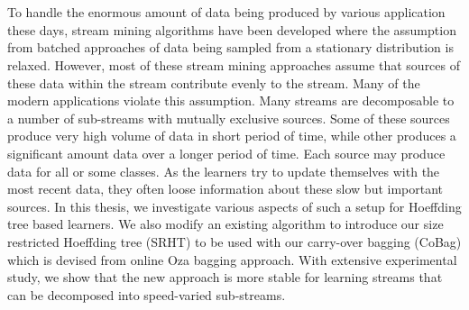 \chapter{\abstractname}
To handle the enormous amount of data being produced by various application these days, stream mining algorithms have been developed where the assumption from batched approaches of data being sampled from a stationary distribution is relaxed.
However, most of these stream mining approaches assume that sources of these data within the stream contribute evenly to the stream.
Many of the modern applications violate this assumption. Many streams are decomposable to a number of sub-streams with mutually exclusive sources. Some of these sources produce very high volume of data in short period of time, while other produces a significant amount data over a longer period of time. Each source may produce data for all or some classes.
As the learners try to update themselves with the most recent data, they often loose information about these slow but important sources.
In this thesis, we investigate various aspects of such a setup for Hoeffding tree based learners. We also modify an existing algorithm to introduce our size restricted Hoeffding tree (SRHT) to be used with our carry-over bagging (CoBag) which is devised from online Oza bagging approach. With extensive experimental study, we show that the new approach is more stable for learning streams that can be decomposed into speed-varied sub-streams.


